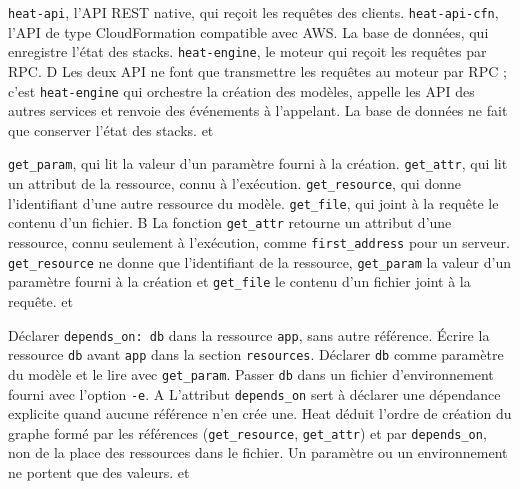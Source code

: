   {\texttt{heat-api}, l'API REST native, qui reçoit les requêtes des clients.}
  {\texttt{heat-api-cfn}, l'API de type CloudFormation compatible avec AWS.}
  {La base de données, qui enregistre l'état des stacks.}
  {\texttt{heat-engine}, le moteur qui reçoit les requêtes par RPC.}
  {D}
  {Les deux API ne font que transmettre les requêtes au moteur par RPC ; c'est \texttt{heat-engine} qui orchestre la création des modèles, appelle les API des autres services et renvoie des événements à l'appelant. La base de données ne fait que conserver l'état des stacks.}
  { et }

  {\texttt{get\_param}, qui lit la valeur d'un paramètre fourni à la création.}
  {\texttt{get\_attr}, qui lit un attribut de la ressource, connu à l'exécution.}
  {\texttt{get\_resource}, qui donne l'identifiant d'une autre ressource du modèle.}
  {\texttt{get\_file}, qui joint à la requête le contenu d'un fichier.}
  {B}
  {La fonction \texttt{get\_attr} retourne un attribut d'une ressource, connu seulement à l'exécution, comme \texttt{first\_address} pour un serveur. \texttt{get\_resource} ne donne que l'identifiant de la ressource, \texttt{get\_param} la valeur d'un paramètre fourni à la création et \texttt{get\_file} le contenu d'un fichier joint à la requête.}
  { et }

  {Déclarer \texttt{depends\_on: db} dans la ressource \texttt{app}, sans autre référence.}
  {Écrire la ressource \texttt{db} avant \texttt{app} dans la section \texttt{resources}.}
  {Déclarer \texttt{db} comme paramètre du modèle et le lire avec \texttt{get\_param}.}
  {Passer \texttt{db} dans un fichier d'environnement fourni avec l'option \texttt{-e}.}
  {A}
  {L'attribut \texttt{depends\_on} sert à déclarer une dépendance explicite quand aucune référence n'en crée une. Heat déduit l'ordre de création du graphe formé par les références (\texttt{get\_resource}, \texttt{get\_attr}) et par \texttt{depends\_on}, non de la place des ressources dans le fichier. Un paramètre ou un environnement ne portent que des valeurs.}
  { et }

